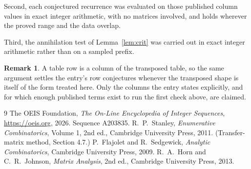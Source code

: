 \documentclass[11pt,a4paper]{article}
\theoremstyle{plain}
\theoremstyle{definition}
\newtheorem{remark}[theorem]{Remark}
\begin{document}
Second, each conjectured recurrence was evaluated on those published column values in exact
integer arithmetic, with no matrices involved, and holds wherever the proved range and the
data overlap.

Third, the annihilation test of Lemma~\ref{lem:crit} was carried out in exact integer
arithmetic rather than on a sampled prefix.

\begin{remark}
A table row is a column of the transposed table, so the same argument settles the entry's row
conjectures whenever the transposed shape is itself of the form treated here. Only the columns
the entry states explicitly, and for which enough published terms exist to run the first check
above, are claimed.
\end{remark}

\begin{thebibliography}{9}
 The OEIS Foundation, \emph{The On-Line Encyclopedia of Integer
Sequences}, \url{https://oeis.org}, 2026. Sequence A203835.
 R.~P.~Stanley, \emph{Enumerative Combinatorics}, Volume 1, 2nd ed.,
Cambridge University Press, 2011. (Transfer-matrix method, Section 4.7.)
 P.~Flajolet and R.~Sedgewick, \emph{Analytic Combinatorics}, Cambridge
University Press, 2009.
 R.~A.~Horn and C.~R.~Johnson, \emph{Matrix Analysis}, 2nd ed., Cambridge
University Press, 2013.
\end{thebibliography}
\end{document}
